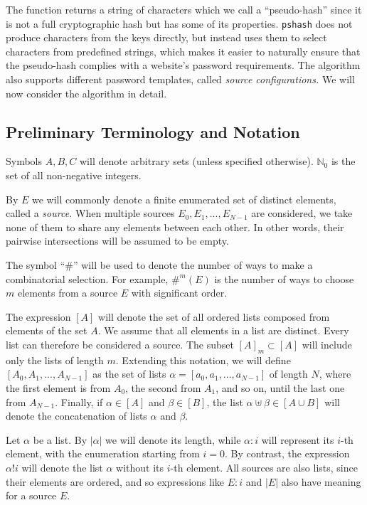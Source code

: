 \documentclass[a4paper, 10pt]{article}
\theoremstyle{plain}
\theoremstyle{definition}
\newcommand{\N}{\mathbb{N}}
\newcommand{\wo}{\mathbin{!}}
\begin{document}
The function returns a string of characters which we call a ``pseudo-hash'' since it is not a full cryptographic hash but has some of its properties. \texttt{pshash} does not produce characters from the keys directly, but instead uses them to select characters from predefined strings, which makes it easier to naturally ensure that the pseudo-hash complies with a website's password requirements. The algorithm also supports different password templates, called \emph{source configurations.} We will now consider the algorithm in detail.

\subsection{Preliminary Terminology and Notation}

Symbols $A, B, C$ will denote arbitrary sets (unless specified otherwise). $\N_0$ is the set of all non-negative integers.

By $E$ we will commonly denote a finite enumerated set of distinct elements, called a \emph{source.} When multiple sources $E_0, E_1, ..., E_{N-1}$ are considered, we take none of them to share any elements between each other. In other words, their pairwise intersections will be assumed to be empty.

The symbol ``$\#$'' will be used to denote the number of ways to make a combinatorial selection. For example, $\#^m (E)$ is the number of ways to choose $m$ elements from a source $E$ with significant order.

The expression $[A]$ will denote the set of all ordered lists composed from elements of the set $A$. We assume that all elements in a list are distinct. Every list can therefore be considered a source. The subset $[A]_m \subset [A]$ will include only the lists of length $m$. Extending this notation, we will define $[A_0, A_1, ..., A_{N-1}]$ as the set of lists $\alpha = [a_0, a_1, ..., a_{N-1}]$ of length $N$, where the first element is from $A_0$, the second from $A_1$, and so on, until the last one from $A_{N-1}$. Finally, if $\alpha \in [A]$ and $\beta \in [B]$, the list $\alpha \uplus \beta \in [A \cup B]$ will denote the concatenation of lists $\alpha$ and $\beta$.

Let $\alpha$ be a list. By $|\alpha|$ we will denote its length, while $\alpha : i$ will represent its $i$-th element, with the enumeration starting from $i = 0$. By contrast, the expression $\alpha \wo i$ will denote the list $\alpha$ without its $i$-th element. All sources are also lists, since their elements are ordered, and so expressions like $E : i$ and $|E|$ also have meaning for a source $E$.
\end{document}

